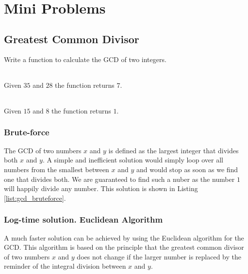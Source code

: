 \chapter{Mini Problems}

\section{Greatest Common Divisor}
\begin{exercise}
    Write a function to calculate the GCD of two integers.
    \begin{example}
        \label{ex:gcd:example1}
        \hfill \\
        Given $35$ and $28$ the function returns $7$.
    \end{example}
    
    \begin{example}
        \label{ex:gcd:example2}
        \hfill \\
        Given $15$ and $8$ the function returns $1$.
    \end{example}

    \end{exercise}

\subsection{\CC Brute-force}
The GCD of two numbers $x$ and $y$ is defined as the largest integer that divides both $x$ and $y$. A simple and inefficient solution would simply loop over all numbers from the smallest between $x$ and $y$ and would stop as soon as we find one that divides both. We are guaranteed to find such a nuber as the number $1$ will happily divide any number. This solution is shown in Listing \ref{list:gcd_bruteforce}.



\subsection{Log-time solution. Euclidean Algorithm}
A much faster solution can be achieved by using the Euclidean algorithm for the GCD.
This algorithm is based on the principle that the greatest common divisor of two numbers $x$ and $y$ does not change if the larger number is replaced by the reminder of the integral division between $x$ and $y$.

